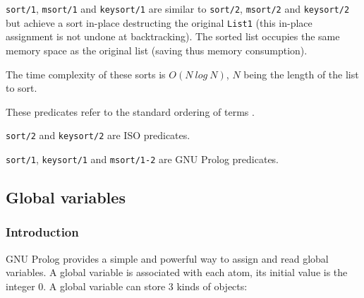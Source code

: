 \texttt{sort/1}, \texttt{msort/1} and \texttt{keysort/1} are similar to
\texttt{sort/2}, \texttt{msort/2} and \texttt{keysort/2} but achieve a sort
in-place destructing the original \texttt{List1} (this in-place assignment is
not undone at backtracking). The sorted list occupies the same memory space
as the original list (saving thus memory consumption).

The time complexity of these sorts is $O(N~log~N)$, $N$ being the length of
the list to sort.

These predicates refer to the standard ordering of terms
.

\begin{PlErrors}







\end{PlErrors}

\Portability

\texttt{sort/2} and \texttt{keysort/2} are ISO predicates.

\texttt{sort/1}, \texttt{keysort/1} and \texttt{msort/1-2} are GNU Prolog predicates.


\subsection{Global variables}

\subsubsection{Introduction}
\label{Global-variables}

GNU Prolog provides a simple and powerful way to assign and read global
variables. A global variable is associated with each atom, its initial value is
the integer 0. A global variable can store 3 kinds of objects:

